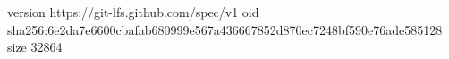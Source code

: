 version https://git-lfs.github.com/spec/v1
oid sha256:6e2da7e6600cbafab680999e567a436667852d870ec7248bf590e76ade585128
size 32864
